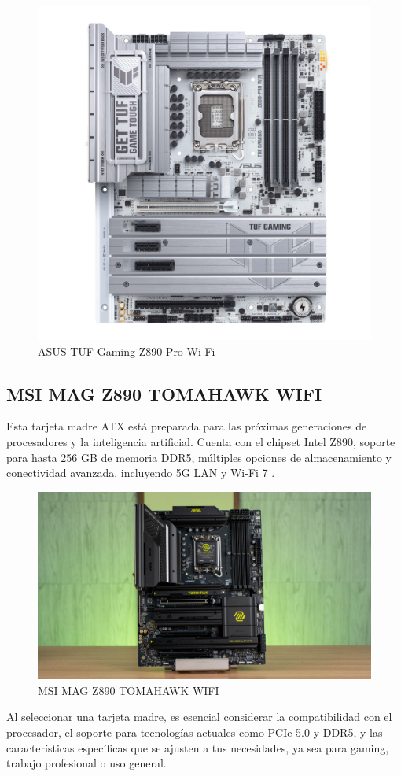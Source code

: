 \begin{figure}
  \centering
  \includegraphics[scale=0.2]{imagenes/asusz890.png}
  \caption{ASUS TUF Gaming Z890-Pro Wi-Fi}
\end{figure}

\subsection{MSI MAG Z890 TOMAHAWK WIFI}

Esta tarjeta madre ATX está preparada para las próximas generaciones de procesadores y la inteligencia artificial. Cuenta con el chipset Intel Z890, soporte para hasta 256 GB de memoria DDR5, múltiples opciones de almacenamiento y conectividad avanzada, incluyendo 5G LAN y Wi-Fi 7 \cite{msiz890tomahawk}.

\begin{figure}
  \centering
  \includegraphics[scale=0.1]{imagenes/z890tomahawk.png}
  \caption{MSI MAG Z890 TOMAHAWK WIFI}
\end{figure}

Al seleccionar una tarjeta madre, es esencial considerar la compatibilidad con el procesador, el soporte para tecnologías actuales como PCIe 5.0 y DDR5, y las características específicas que se ajusten a tus necesidades, ya sea para gaming, trabajo profesional o uso general.
